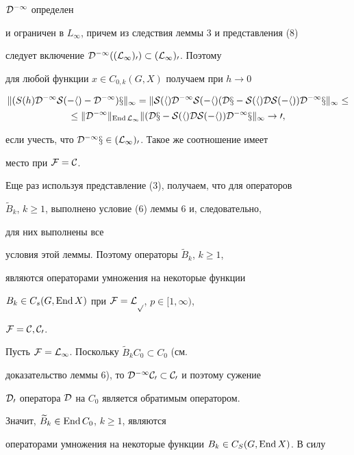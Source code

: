 \begin{pf}
$\cal D^{-1}$ определен 


и ограничен в $L_\infty$, причем из следствия леммы 3 и представления (8) 


следует включение $\cal D^{-1}((L_\infty)_0)\subset(L_\infty)_0$. Поэтому 


для любой функции $x\in C_{0,k}(G,X)$ получаем при $h\to 0$ 


\begin{gather*} 


\|(S(h)\cal D^{-1}S(-h)-\cal D^{-1})x\|_\infty= 


\|S(h)\cal D^{-1}S(-h)(\cal Dx-S(h)\cal DS(-h))\cal D^{-1}x\|_\infty\le\\ 


% 


\le\|\cal D^{-1}\|_{\End L_\infty}\|(\cal Dx-S(h)\cal DS(-h)) 


\cal D^{-1}x\|_\infty\to 0, 


\end{gather*} 


если учесть, что $\cal D^{-1}x\in(L_\infty)_0$. Такое же соотношение имеет 


место при $\cal F=C$. 


 


Еще раз используя представление (3), получаем, что для операторов 


$\widetilde B_k$, $k\ge 1$, выполнено условие (6) леммы 6 и, следовательно, 


для них выполнены все 


условия этой леммы. Поэтому операторы $\widetilde B_k$, $k\ge 1$, 


являются операторами умножения на некоторые функции 


$B_k\in C_s(G,\operatorname{End} X)$ при $\cal F=L_p$, $p\in[1,\infty)$, 


$\cal F=C,C_0$. 


 


Пусть $\cal F=L_\infty$. Поскольку $\widetilde B_kC_0\subset C_0$ (см. 


доказательство леммы 6), то $\cal D^{-1}C_0\subset C_0$ и поэтому сужение 


$\cal D_0$ оператора $\cal D$ на $C_0$ является обратимым оператором. 


Значит, $\widetilde B_k\in\operatorname{End} C_0$, $k\ge 1$, являются 


операторами умножения на некоторые функции $B_k\in C_S(G,\operatorname{End} X)$. В силу 



\end{pf}
